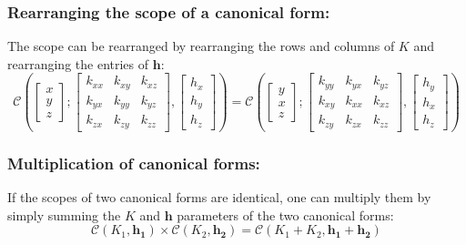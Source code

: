 \documentclass[12pt,oneside,openany,a4paper, %
afrikaans,english,
]{memoir}
\numberwithin{equation}{chapter}
\begin{document}
\subsubsection{Rearranging the scope of a canonical form:}
The scope can be rearranged by rearranging the rows and columns of $K$  and rearranging the entries of $\bm{h}$:
\begin{equation}
\mathcal{C}\left(
\begin{bmatrix}
x\\
y\\
z
\end{bmatrix};
\begin{bmatrix}
k_{xx} & k_{xy} & k_{xz}\\
k_{yx} & k_{yy} & k_{yz}\\
k_{zx} & k_{zy} & k_{zz}
\end{bmatrix},
\begin{bmatrix}
h_x\\
h_y\\
h_z
\end{bmatrix}
\right)
=
\mathcal{C}\left(
\begin{bmatrix}
y\\
x\\
z
\end{bmatrix};
\begin{bmatrix}
k_{yy} & k_{yx} & k_{yz}\\
k_{xy} & k_{xx} & k_{xz}\\
k_{zy} & k_{zx} & k_{zz}
\end{bmatrix},
\begin{bmatrix}
h_y\\
h_x\\
h_z
\end{bmatrix}
\right)
\end{equation}
\subsubsection{Multiplication of canonical forms:}
If the scopes of two canonical forms are identical, one can multiply them by simply summing the $K$ and $\bm{h}$ parameters of the two canonical forms:
\begin{equation}\label{eq:10}
\mathcal{C}(K_1,\bm{h_1})\times\mathcal{C}(K_2,\bm{h_2}) = \mathcal{C}(K_1 + K_2,\bm{h_1} + \bm{h_2})
\end{equation}
\end{document}
